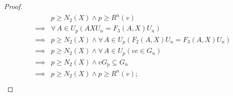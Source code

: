 \documentclass[11pt]{amsart}
\theoremstyle{definition}
\theoremstyle{remark}
\numberwithin{equation}{section}
\begin{document}
\begin{proof}
    \begin{align}
        &\begin{aligned}
            &p\geq N_2(X)\land p\geq R^n(v)\\
            \implies&\forall\,A\in U_p\left(AXU_n=F_3(A,X)U_n\right)\\
            \implies&p\geq N_2(X)\land\forall\,A\in U_p\left(F_2(A,X)U_n=F_3(A,X)U_n\right)\\
            \implies&p\geq N_2(X)\land\forall\,A\in U_p\left(vc\in G_n\right)\\
            \implies&p\geq N_2(X)\land vG_p\subseteq G_n\\
            \implies&p\geq N_2(X)\land p\geq R^n(v);
        \end{aligned}\\

\end{align}
\end{proof}
\end{document}
